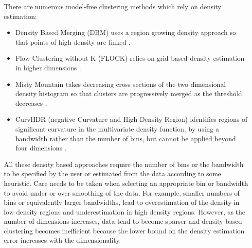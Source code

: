 There are numerous model-free clustering methods which rely on density estimation:
\begin{itemize}
  \item Density Based Merging (DBM) uses a region growing density approach so that points of high density are linked \citep{Walther:2009gn}.
  \item Flow Clustering without K (FLOCK) relies on grid based density estimation in higher dimensions \citep{Qian:2010ep}.
  \item Misty Mountain takes decreasing cross sections of the two dimensional density histogram so that clusters are progressively merged as the threshold decreases \citep{Sugar:2010jf}.
  \item CurvHDR (negative Curvature and High Density Region) identifies regions of significant curvature in the multivariate density function,
by using a bandwidth rather than the number of bins, but cannot be applied beyond four dimensions \citep{Naumann:2010fp}.
\end{itemize}
All these density based approaches require the number of bins or the bandwidth to be specified by the user or estimated from the data according to some heuristic.
Care needs to be taken when selecting an appropriate bin or bandwidth to avoid under or over smoothing of the data.
For example, smaller numbers of bins or equivalently larger bandwidths, lead to overestimation of the density in low density regions and underestimation in high density regions.
However, as the number of dimensions increases, data tend to become sparser
and density based clustering becomes inefficient because the lower bound on the density estimation error increases with the dimensionality.
